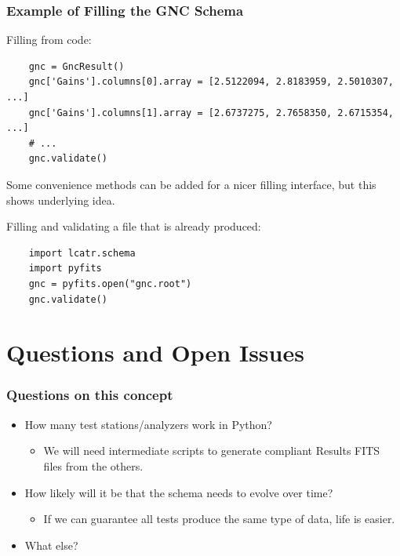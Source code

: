 \documentclass[xcolor=dvipsnames]{beamer}
\begin{document}
\begin{frame}[fragile]
  \frametitle{Example of Filling the GNC Schema}
  
  Filling from code:
  \begin{lstlisting}
    gnc = GncResult()
    gnc['Gains'].columns[0].array = [2.5122094, 2.8183959, 2.5010307, ...]
    gnc['Gains'].columns[1].array = [2.6737275, 2.7658350, 2.6715354, ...]
    # ...
    gnc.validate()
  \end{lstlisting}

  Some convenience methods can be added for a nicer filling interface,
  but this shows underlying idea.

  \vspace{3mm}

  Filling and validating a file that is already produced:

  \begin{lstlisting}
    import lcatr.schema
    import pyfits
    gnc = pyfits.open("gnc.root")
    gnc.validate()
  \end{lstlisting}
\end{frame}

\section{Questions and Open Issues}

\begin{frame}
  \frametitle{Questions on this concept}
  \begin{itemize}
  \item How many test stations/analyzers work in Python?  
    \begin{itemize}
    \item We will need intermediate scripts to generate compliant
      Results FITS files from the others.
    \end{itemize}
  \item How likely will it be that the schema needs to evolve over
    time?
    \begin{itemize}
    \item If we can guarantee all tests produce the same type of data,
      life is easier.
    \end{itemize}
  \item What else?
  \end{itemize}
\end{frame}
\end{document}

